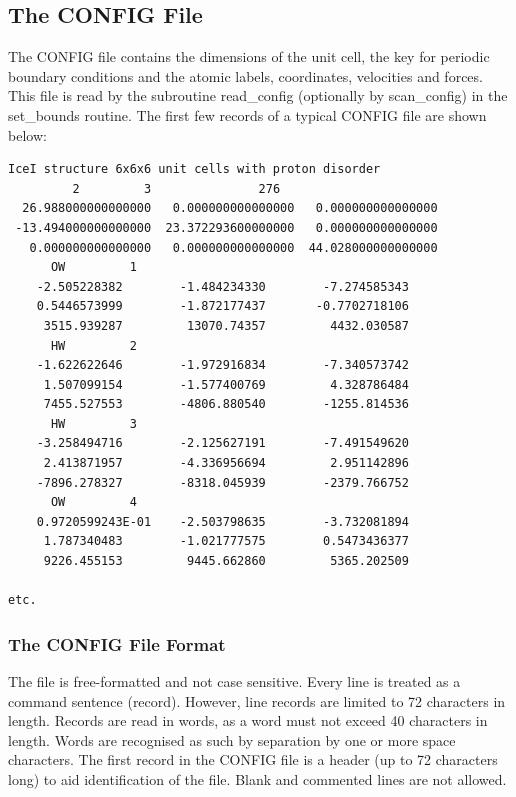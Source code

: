 \subsection{The CONFIG File}
\label{config-file}

The CONFIG file contains the dimensions of the unit cell, the key
for periodic boundary conditions and the atomic labels,
coordinates, velocities and forces.  This file is read by the
subroutine {\sc read\_config} (optionally by {\sc scan\_config})
in the {\sc set\_bounds} routine.  The first few records of a
typical CONFIG file are shown below:

\begin{lstlisting}
IceI structure 6x6x6 unit cells with proton disorder
         2         3               276
  26.988000000000000   0.000000000000000   0.000000000000000
 -13.494000000000000  23.372293600000000   0.000000000000000
   0.000000000000000   0.000000000000000  44.028000000000000
      OW         1
    -2.505228382        -1.484234330        -7.274585343
    0.5446573999        -1.872177437       -0.7702718106
     3515.939287         13070.74357         4432.030587
      HW         2
    -1.622622646        -1.972916834        -7.340573742
     1.507099154        -1.577400769         4.328786484
     7455.527553        -4806.880540        -1255.814536
      HW         3
    -3.258494716        -2.125627191        -7.491549620
     2.413871957        -4.336956694         2.951142896
    -7896.278327        -8318.045939        -2379.766752
      OW         4
    0.9720599243E-01    -2.503798635        -3.732081894
     1.787340483        -1.021777575        0.5473436377
     9226.455153         9445.662860         5365.202509

etc.
\end{lstlisting}

\subsubsection{The CONFIG File Format}

The file is free-formatted and not case sensitive.  Every line is
treated as a command sentence (record).  However, line records are
limited to 72 characters in length.  Records are read in words,
as a word must not exceed 40 characters in length.  Words are
recognised as such by separation by one or more space characters.
The first record in the CONFIG file is a header (up to 72
characters long) to aid identification of the file.  Blank and
commented lines are not allowed.


